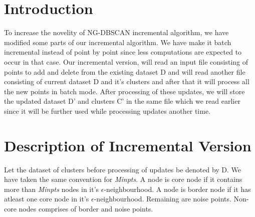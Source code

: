 \documentclass[acmsmall]{acmart}
\begin{document}
\section*{Introduction}
To increase the novelity of NG-DBSCAN incremental algorithm, we have modified some parts of our incremental algorithm. We have make it batch incremental instead of point by point since less computations are expected to occur in that case. Our incremental version, will read an input file consisting of points to add and delete from the existing dataset D and will read another file consisting of current dataset D and it's clusters and after that it will process all the new points in batch mode. After processing of these updates, we will store the updated dataset D' and clusters C' in the same file which we read earlier since it will be further used while processing updates another time.

\section*{Description of Incremental Version}
Let the dataset of clusters before processing of updates be denoted by D. We have taken the same convention for \textit{Minpts}. A node is core node if it contains more than \textit{Minpts} nodes in it's $\epsilon$-neighbourhood. A node is border node if it has atleast one core node in it's $\epsilon$-neighbourhood. Remaining are noise points. Non-core nodes comprises of border and noise points.
\end{document}
